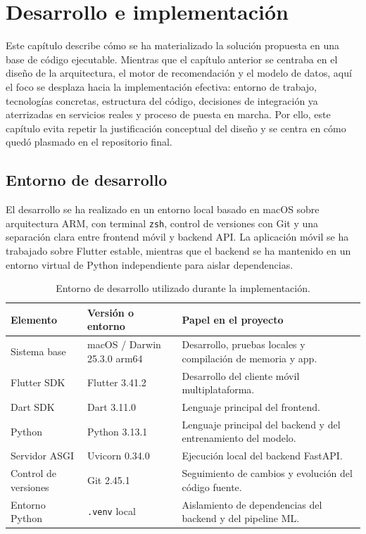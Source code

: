 \chapter{Desarrollo e implementación}
\label{ch:desarrollo_implementacion}

Este capítulo describe cómo se ha materializado la solución propuesta en una
base de código ejecutable. Mientras que el capítulo anterior se centraba en el
diseño de la arquitectura, el motor de recomendación y el modelo de datos, aquí
el foco se desplaza hacia la implementación efectiva: entorno de trabajo,
tecnologías concretas, estructura del código, decisiones de integración ya
aterrizadas en servicios reales y proceso de puesta en marcha. Por ello, este
capítulo evita repetir la justificación conceptual del diseño y se centra en
cómo quedó plasmado en el repositorio final.

\section{Entorno de desarrollo}
\label{sec:entorno_desarrollo}

El desarrollo se ha realizado en un entorno local basado en macOS sobre
arquitectura ARM, con terminal \texttt{zsh}, control de versiones con Git y una
separación clara entre frontend móvil y backend API. La aplicación móvil se ha
trabajado sobre Flutter estable, mientras que el backend se ha mantenido en un
entorno virtual de Python independiente para aislar dependencias.

\begin{table}[H]
\centering
\scriptsize
\renewcommand{\arraystretch}{1.1}
\setlength{\tabcolsep}{4pt}
\begin{tabularx}{\textwidth}{|P{3.0cm}|P{3.0cm}|Y|}
\hline
\textbf{Elemento} & \textbf{Versión o entorno} & \textbf{Papel en el proyecto} \\
\hline
Sistema base & macOS / Darwin 25.3.0 arm64 & Desarrollo, pruebas locales y compilación de memoria y app. \\
\hline
Flutter SDK & Flutter 3.41.2 & Desarrollo del cliente móvil multiplataforma. \\
\hline
Dart SDK & Dart 3.11.0 & Lenguaje principal del frontend. \\
\hline
Python & Python 3.13.1 & Lenguaje principal del backend y del entrenamiento del modelo. \\
\hline
Servidor ASGI & Uvicorn 0.34.0 & Ejecución local del backend FastAPI. \\
\hline
Control de versiones & Git 2.45.1 & Seguimiento de cambios y evolución del código fuente. \\
\hline
Entorno Python & \texttt{.venv} local & Aislamiento de dependencias del backend y del pipeline ML. \\
\hline
\end{tabularx}
\caption{Entorno de desarrollo utilizado durante la implementación.}
\label{tab:entorno_desarrollo}
\end{table}

